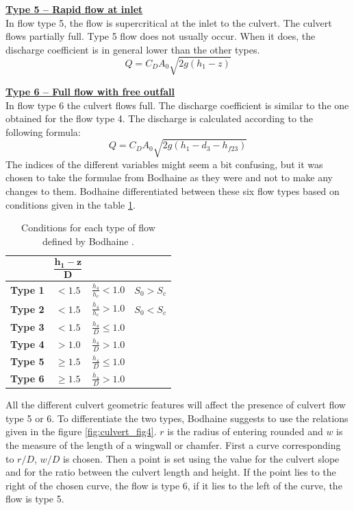 \underline{\textbf{Type 5 -- Rapid flow at inlet}}\\

In flow type 5, the flow is supercritical at the inlet to the culvert.
The culvert flows partially full. Type 5 flow does not usually occur.
When it does, the discharge coefficient is in general lower than the other types.
\begin{equation}
Q=C_D A_0 \sqrt{2g(h_1-z)}
\end{equation}

\underline{\textbf{Type 6 -- Full flow with free outfall}}\\

In flow type 6 the culvert flows full. The discharge coefficient is similar to the
one obtained for the flow type 4.
The discharge is calculated according to the following formula:
\begin{equation}
Q=C_D A_0 \sqrt{2g(h_1-d_3-h_{f23})}
\end{equation}
The indices of the different variables might seem a bit confusing,
but it was chosen to take the formulae from Bodhaine as they were
and not to make any changes to them.
Bodhaine differentiated between these six flow types based on conditions
given in the table \ref{tab:culvert_tab1}.

\begin{table}[H]
\caption{Conditions for each type of flow defined by Bodhaine \cite{Bodhaine1968}.}\label{tab:culvert_tab1}
\begin{center}\begin{tabular}{|c|c|c|c|}
\hline
~ & $\mathbf{\dfrac{h_1-z}{D}}$ & ~ & ~\\
\hline
\textbf{Type 1} & $<1.5$    &  $\frac{h_4}{h_c} < 1.0$ & $S_0 > S_c$\\
\hline
\textbf{Type 2} & $<1.5$    &  $\frac{h_4}{h_c} > 1.0$ & $S_0 < S_c$\\
\hline
\textbf{Type 3} & $<1.5$    & $\frac{h_4}{D} \le 1.0$ & ~\\
\hline
\textbf{Type 4} & $> 1.0$   & $\frac{h_4}{D} > 1.0$ & ~\\
\hline
\textbf{Type 5} & $\ge 1.5$ & $\frac{h_4}{D} \le 1.0$ & ~\\
\hline
\textbf{Type 6} & $\ge 1.5$ & $\frac{h_4}{D} > 1.0$  & ~\\
\hline
\end{tabular}\end{center}
\end{table}

All the different culvert geometric features will affect the presence of culvert flow type 5 or 6.
To differentiate the two types, Bodhaine \cite{Bodhaine1968} suggests to use the relations given in the figure \ref{fig:culvert_fig4}.
$r$ is the radius of entering rounded and $w$ is the measure of the length of a wingwall
or chamfer. First a curve corresponding to $r/D$, $w/D$ is chosen.
Then a point is set using the value for the culvert slope and for the ratio
between the culvert length and height.
If the point lies to the right of the chosen curve, the flow is type 6,
if it lies to the left of the curve, the flow is type 5.

